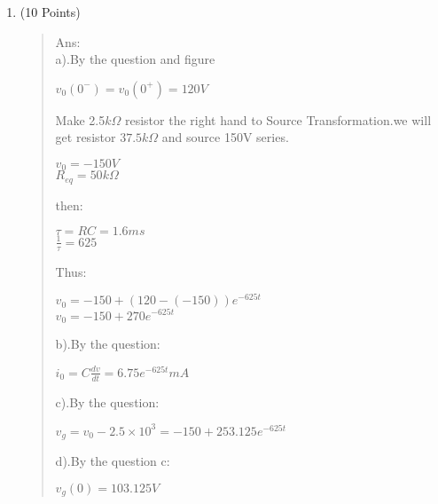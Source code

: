 \documentclass[12pt,a4paper]{article}
\begin{document}
\begin{enumerate}
		\clearpage
		\item (10 Points)
		\begin{quote}
			Ans:\\
			a).By the question and figure
			\begin{center}
				$v_0(0^-) =v_0(0^+)=120V$
			\end{center}
			Make 2.5$k\Omega$ resistor the right hand to Source Transformation.we will get resistor $37.5k\Omega$ and source 150V series.
			\begin{center}
				$v_0=-150V$\\
				$R_{eq} = 50k\Omega$
			\end{center}
			then:
			\begin{center}
				$\tau=RC=1.6ms$
				\\$\frac{1}{\tau}=625$
			\end{center}
			Thus:
			\begin{center}
				$v_0=-150+(120-(-150))e^{-625t}$\\
				$v_0=-150+270e^{-625t}$
			\end{center}
			b).By the question:
			\begin{center}
				$i_0=C\frac{dv}{dt}=6.75e^{-625t}mA$
			\end{center}
			c).By the question:
			\begin{center}
				$v_g=v_0-2.5\times 10^3=-150+253.125e^{-625t}$  
			\end{center}	
			d).By the question c:
				\begin{center}
					$v_g(0) = 103.125V$
				\end{center}
		\end{quote}
		\clearpage
		

\end{enumerate}
\end{document}
